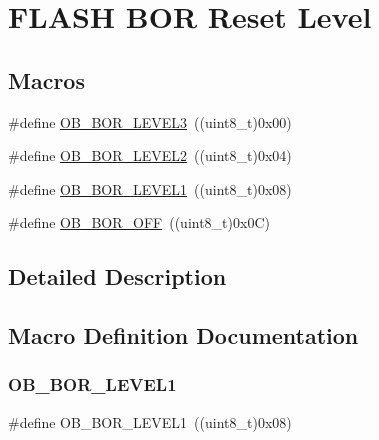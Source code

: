 \hypertarget{group___f_l_a_s_h_ex___b_o_r___reset___level}{}\section{F\+L\+A\+SH B\+OR Reset Level}
\label{group___f_l_a_s_h_ex___b_o_r___reset___level}
\subsection*{Macros}
\begin{DoxyCompactItemize}
\item 
\#define \mbox{\hyperlink{group___f_l_a_s_h_ex___b_o_r___reset___level_ga3132b8202c0a345e9dd33d136714b046}{O\+B\+\_\+\+B\+O\+R\+\_\+\+L\+E\+V\+E\+L3}}~((uint8\+\_\+t)0x00)
\item 
\#define \mbox{\hyperlink{group___f_l_a_s_h_ex___b_o_r___reset___level_gad678e849fcf817f6ed2d837538e8ebc2}{O\+B\+\_\+\+B\+O\+R\+\_\+\+L\+E\+V\+E\+L2}}~((uint8\+\_\+t)0x04)
\item 
\#define \mbox{\hyperlink{group___f_l_a_s_h_ex___b_o_r___reset___level_ga3a888b788e75f0bc1f9add85c9ccd9d6}{O\+B\+\_\+\+B\+O\+R\+\_\+\+L\+E\+V\+E\+L1}}~((uint8\+\_\+t)0x08)
\item 
\#define \mbox{\hyperlink{group___f_l_a_s_h_ex___b_o_r___reset___level_gaabc231cb1d05a94fe860f67bb5a37b12}{O\+B\+\_\+\+B\+O\+R\+\_\+\+O\+FF}}~((uint8\+\_\+t)0x0\+C)
\end{DoxyCompactItemize}


\subsection{Detailed Description}


\subsection{Macro Definition Documentation}
\mbox{\label{group___f_l_a_s_h_ex___b_o_r___reset___level_ga3a888b788e75f0bc1f9add85c9ccd9d6}} 
\subsubsection{\texorpdfstring{O\+B\+\_\+\+B\+O\+R\+\_\+\+L\+E\+V\+E\+L1}{OB\_BOR\_LEVEL1}}
{\footnotesize\ttfamily \#define O\+B\+\_\+\+B\+O\+R\+\_\+\+L\+E\+V\+E\+L1~((uint8\+\_\+t)0x08)}

